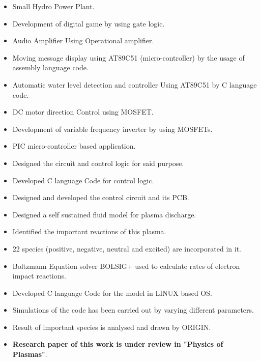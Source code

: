 \documentclass[10pt,a4paper]{altacv}
\begin{document}
\begin{itemize}
\item Small Hydro Power Plant.
\item Development of digital game by using gate logic.
\item Audio Amplifier Using Operational amplifier.
\item Moving message display using AT89C51 (micro-controller) by the usage of assembly language code.
\item Automatic water level detection and controller Using AT89C51 by C language code.
\item DC motor direction Control using MOSFET.
\item Development of variable frequency inverter by using MOSFETs.
\end{itemize}

\begin{itemize}
\item PIC micro-controller based application.
\item Designed the circuit and control logic for said purpose.
\item Developed C language Code for control logic.
\item Designed and developed the control circuit and its PCB. 
\end{itemize}

\begin{itemize}
\item Designed a self sustained fluid model for plasma discharge.
\item Identified the important reactions of this plasma.
\item 22 species (positive, negative, neutral and excited) are incorporated in it.
\item Boltzmann Equation solver BOLSIG+ used to calculate rates of electron impact reactions.
\item Developed C language Code for the model in LINUX based OS.
\item Simulations of the code has been carried out by varying different parameters.
\item Result of important species is analysed and drawn by ORIGIN.
\item \textbf{Research paper of this work is under review in "Physics of Plasmas"}.
\end{itemize}
\end{document}
